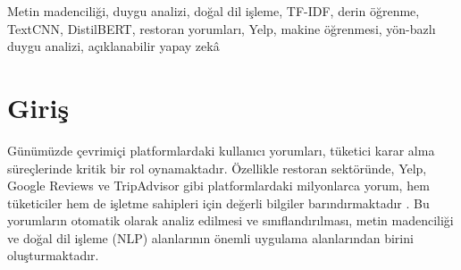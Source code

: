 \documentclass[conference]{IEEEtran}
\begin{document}
\begin{abstract}
\vspace{1em}
\textbf{\textit{Abstract---}} In this study, customer experience quality classification was performed using text mining techniques on approximately 1.6 million restaurant reviews obtained from the Yelp open dataset. The raw text data was passed through a comprehensive natural language processing (NLP) pipeline and transformed into TF-IDF and sequence-based feature vectors. To maintain experimental validity, train, validation, and test splits were made prior to feature extraction; the TF-IDF vectorizer, numerical scaler, and tokenizer were fitted solely on the training set. Logistic Regression, Support Vector Machines (SVM), SGD, TextCNN, and FastText models were trained and compared. Furthermore, the Transformer-based DistilBERT model was fine-tuned on the entire official training split and evaluated on the exact same official test indices. Test set results indicate that the Logistic Regression model exhibited the highest performance with 80.41\% accuracy and 80.40\% F1-Macro score. Model decisions were interpreted using the Explainable AI (LIME) method, and sentiment analysis was performed on specific dimensions such as food, service, ambiance, and price using Aspect-Based Sentiment Analysis (ABSA). Additionally, sarcasm detection, text decoding (emoji/slang translation), and reviewer profiling modules were developed and integrated into an interactive Flask-based web application.
\end{abstract}

\begin{IEEEkeywords}
Metin madenciliği, duygu analizi, doğal dil işleme, TF-IDF, derin öğrenme, TextCNN, DistilBERT, restoran yorumları, Yelp, makine öğrenmesi, yön-bazlı duygu analizi, açıklanabilir yapay zekâ
\end{IEEEkeywords}

\section{Giriş}
\label{sec:giris}

Günümüzde çevrimiçi platformlardaki kullanıcı yorumları, tüketici karar alma süreçlerinde kritik bir rol oynamaktadır. Özellikle restoran sektöründe, Yelp, Google Reviews ve TripAdvisor gibi platformlardaki milyonlarca yorum, hem tüketiciler hem de işletme sahipleri için değerli bilgiler barındırmaktadır \cite{liu2012sentiment}. Bu yorumların otomatik olarak analiz edilmesi ve sınıflandırılması, metin madenciliği ve doğal dil işleme (NLP) alanlarının önemli uygulama alanlarından birini oluşturmaktadır.
\end{document}
